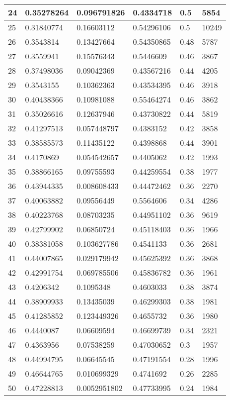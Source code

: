 \begin{longtable}{|l|l|l|l|l|l|}
24 & 0.35278264 & 0.096791826 & 0.4334718 & 0.5 & 5854 \\ \hline 
25 & 0.31840774 & 0.16603112 & 0.54296106 & 0.5 & 10249 \\ \hline 
26 & 0.3543814 & 0.13427664 & 0.54350865 & 0.48 & 5787 \\ \hline 
27 & 0.3559941 & 0.15576343 & 0.5446609 & 0.46 & 3867 \\ \hline 
28 & 0.37498036 & 0.09042369 & 0.43567216 & 0.44 & 4205 \\ \hline 
29 & 0.3543155 & 0.10362363 & 0.43534395 & 0.46 & 3918 \\ \hline 
30 & 0.40438366 & 0.10981088 & 0.55464274 & 0.46 & 3862 \\ \hline 
31 & 0.35026616 & 0.12637946 & 0.43730822 & 0.44 & 5819 \\ \hline 
32 & 0.41297513 & 0.057448797 & 0.4383152 & 0.42 & 3858 \\ \hline 
33 & 0.38585573 & 0.11435122 & 0.4398868 & 0.44 & 3901 \\ \hline 
34 & 0.4170869 & 0.054542657 & 0.4405062 & 0.42 & 1993 \\ \hline 
35 & 0.38866165 & 0.09755593 & 0.44259554 & 0.38 & 1977 \\ \hline 
36 & 0.43944335 & 0.008608433 & 0.44472462 & 0.36 & 2270 \\ \hline 
37 & 0.40063882 & 0.09556449 & 0.5564606 & 0.34 & 4286 \\ \hline 
38 & 0.40223768 & 0.08703235 & 0.44951102 & 0.36 & 9619 \\ \hline 
39 & 0.42799902 & 0.06850724 & 0.45118403 & 0.36 & 1966 \\ \hline 
40 & 0.38381058 & 0.103627786 & 0.4541133 & 0.36 & 2681 \\ \hline 
41 & 0.44007865 & 0.029179942 & 0.45625392 & 0.36 & 3868 \\ \hline 
42 & 0.42991754 & 0.069785506 & 0.45836782 & 0.36 & 1961 \\ \hline 
43 & 0.4206342 & 0.1095348 & 0.4603033 & 0.38 & 3874 \\ \hline 
44 & 0.38909933 & 0.13435039 & 0.46299303 & 0.38 & 1981 \\ \hline 
45 & 0.41285852 & 0.123449326 & 0.4655732 & 0.36 & 1980 \\ \hline 
46 & 0.4440087 & 0.06609594 & 0.46699739 & 0.34 & 2321 \\ \hline 
47 & 0.4363956 & 0.07538259 & 0.47030652 & 0.3 & 1957 \\ \hline 
48 & 0.44994795 & 0.06645545 & 0.47191554 & 0.28 & 1996 \\ \hline 
49 & 0.46644765 & 0.010699329 & 0.4741692 & 0.26 & 2285 \\ \hline 
50 & 0.47228813 & 0.0052951802 & 0.47733995 & 0.24 & 1984 \\ \hline 
\end{longtable}
